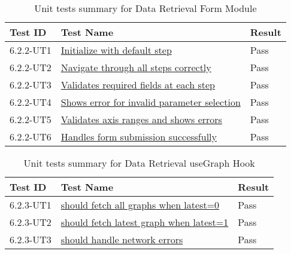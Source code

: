 \documentclass[12pt, titlepage]{article}
\begin{document}
\begin{table}[H]
  \centering
  \begin{tabular}{|l|l|l|}
    \hline
    \textbf{Test ID} & \textbf{Test Name} & \textbf{Result}\\
    \hline
    6.2.2-UT1 &
    \href{https://github.com/SumanyaG/Alkalytics/blob/documentation/VnV/src/frontend/test/components/modals/DataFormModel.test.tsx}{Initialize
    with default step} & Pass \\
    \hline
    6.2.2-UT2 &
    \href{https://github.com/SumanyaG/Alkalytics/blob/documentation/VnV/src/frontend/test/components/modals/DataFormModel.test.tsx}{Navigate
    through all steps correctly} & Pass \\
    \hline
    6.2.2-UT3 &
    \href{https://github.com/SumanyaG/Alkalytics/blob/documentation/VnV/src/frontend/test/components/modals/DataFormModel.test.tsx}{Validates
    required fields at each step} & Pass \\
    \hline
    6.2.2-UT4 &
    \href{https://github.com/SumanyaG/Alkalytics/blob/documentation/VnV/src/frontend/test/components/modals/DataFormModel.test.tsx}{Shows
    error for invalid parameter selection} & Pass \\
    \hline
    6.2.2-UT5 &
    \href{https://github.com/SumanyaG/Alkalytics/blob/documentation/VnV/src/frontend/test/components/modals/DataFormModel.test.tsx}{Validates
    axis ranges and shows errors} & Pass \\
    \hline
    6.2.2-UT6 &
    \href{https://github.com/SumanyaG/Alkalytics/blob/documentation/VnV/src/frontend/test/components/modals/DataFormModel.test.tsx}{Handles
    form submission successfully} & Pass \\
    \hline
  \end{tabular}
  \caption{Unit tests summary for Data Retrieval Form Module}
  \label{UT:DataRetrieval2}
\end{table}


\begin{table}[H]
  \centering
  \begin{tabular}{|l|l|l|}
    \hline
    \textbf{Test ID} & \textbf{Test Name} & \textbf{Result}\\
    \hline
    6.2.3-UT1 &
    \href{https://github.com/SumanyaG/Alkalytics/blob/main/src/frontend/test/hooks/useGraph.test.tsx}{should
    fetch all graphs when latest=0} & Pass \\
    \hline
    6.2.3-UT2 &
    \href{https://github.com/SumanyaG/Alkalytics/blob/main/src/frontend/test/hooks/useGraph.test.tsx}{should
    fetch latest graph when latest=1} & Pass \\
    \hline
    6.2.3-UT3 &
    \href{https://github.com/SumanyaG/Alkalytics/blob/main/src/frontend/test/hooks/useGraph.test.tsx}{should
    handle network errors} & Pass \\
    \hline
  \end{tabular}
  \caption{Unit tests summary for Data Retrieval useGraph Hook}
  \label{UT:DataRetrieval3}
\end{table}
\end{document}
